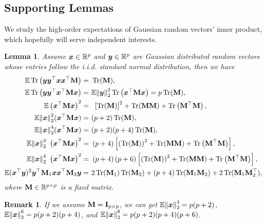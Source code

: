 \documentclass[11pt]{article}
\newtheorem{lemma}{Lemma}
\newtheorem{remark}{Remark}
\begin{document}
\subsection{Supporting Lemmas}
We study the high-order expectations of Gaussian random vectors' inner product, which hopefully
will serve independent interests.
\begin{lemma}
Assume $\boldsymbol{x} \in \mathbb{R}^p$ and $\boldsymbol{y} \in \mathbb{R}^p$ are Gaussian distributed
random vectors whose entries follow the i.i.d. standard normal distribution, then we have
\begin{align}
\Expc \trace\bracket{\by \by^{\rmt} \bx \bx^{\rmt}\bM }
=~& \trace(\bM), \label{eq:cross_term_quad_expc} \\
\Expc \trace\bracket{\by \by^{\rmt} \bx^{\rmt}\bM \bx}
=~& \Expc \norm{\by}{2}^2 \trace\bracket{\bx^{\rmt}\bM \bx} = p\trace(\bM)  \label{eq:single_quad_expc}, \\
\Expc\bracket{\bx^{\rmt} \bM \bx}^2 =~& \
\Bracket{\trace(\bM)}^2 + \trace(\bM \bM)+ \trace\bracket{\bM^{\rmt}\bM}, \label{eq:double_quad_expc} \\
\Expc \norm{\bx}{2}^2  (\bx^{\rmt}\bM \bx)
=~& (p+2)\trace(\bM), \label{eq:four_order_expc}\\
\Expc \norm{\bx}{2}^4
(\bx^{\rmt}\bM \bx)
=~& (p+2)(p+4) \trace(\bM) \label{eq:six_order_expc}, \\
\Expc \norm{\bx}{2}^2 \
\bracket{\bx^{\rmt}\bM \bx}^2 =~&
\bracket{p+4}\Bracket{\bracket{\trace(\bM)}^2 + \trace(\bM \bM)+ \trace\bracket{\bM^{\rmt}\bM}}
\label{eq:six_order_expc_type2}, \\
\Expc \norm{\bx}{2}^4 \
\bracket{\bx^{\rmt}\bM \bx}^2 =~&
\bracket{p+4}\bracket{p+6}\Bracket{\bracket{\trace(\bM)}^2 + \trace(\bM \bM)+ \trace\bracket{\bM^{\rmt}\bM}},
\label{eq:eight_order_expc} \\
\Expc (\bx^{\rmt}\by)^2
\by^{\rmt}\bM_1 \bx \bx^{\rmt} \bM_2 \by =~&  2\trace(\bM_1)\trace(\bM_2) + \bracket{p+4}\trace(\bM_1\bM_2)
+ 2\trace(\bM_1 \bM_2^{\rmt}),
\label{eq:eight_cross_term_expc}
\end{align}
where $\mathbf{M} \in \mathbb{R}^{p\times p}$ is a fixed matrix.
\end{lemma}

\begin{remark}
If we assume $\mathbf{M} = \mathbf{I}_{p\times p}$, we can get
$\mathbb{E} {\left\|\boldsymbol{x}\right\|}_{2}^4 = p(p+2)$,
$\mathbb{E} {\left\|\boldsymbol{x}\right\|}_{2}^6 = p(p+2)(p+4)$,
and $\mathbb{E} {\left\|\boldsymbol{x}\right\|}_{2}^8 = p(p+2)(p+4)(p+6)$.
\end{remark}
\end{document}
